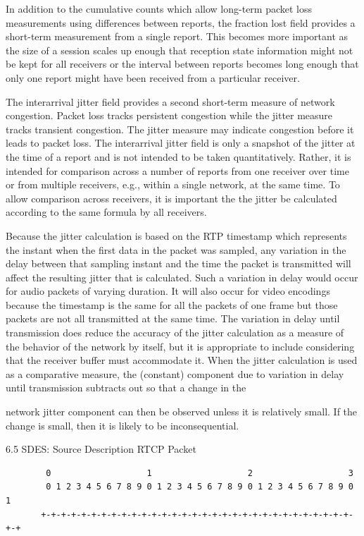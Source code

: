 \documentclass{article}
\begin{document}
In addition to the cumulative counts which allow long-term packet loss measurements using differences between reports, the fraction lost field provides a short-term measurement from a single report. This becomes more important as the size of a session scales up enough that reception state information might not be kept for all receivers or the interval between reports becomes long enough that only one report might have been received from a particular receiver.

The interarrival jitter field provides a second short-term measure of network congestion.  Packet loss tracks persistent congestion while the jitter measure tracks transient congestion.  The jitter measure may indicate congestion before it leads to packet loss.  The interarrival jitter field is only a snapshot of the jitter at the time of a report and is not intended to be taken quantitatively. Rather, it is intended for comparison across a number of reports from one receiver over time or from multiple receivers, e.g., within a single network, at the same time.  To allow comparison across receivers, it is important the the jitter be calculated according to the same formula by all receivers.

Because the jitter calculation is based on the RTP timestamp which represents the instant when the first data in the packet was sampled, any variation in the delay between that sampling instant and the time the packet is transmitted will affect the resulting jitter that is calculated.  Such a variation in delay would occur for audio packets of varying duration.  It will also occur for video encodings because the timestamp is the same for all the packets of one frame but those packets are not all transmitted at the same time.  The variation in delay until transmission does reduce the accuracy of the jitter calculation as a measure of the behavior of the network by itself, but it is appropriate to include considering that the receiver buffer must accommodate it.  When the jitter calculation is used as a comparative measure, the (constant) component due to variation in delay until transmission subtracts out so that a change in the

network jitter component can then be observed unless it is relatively small.  If the change is small, then it is likely to be inconsequential.

6.5 SDES: Source Description RTCP Packet

\begin{verbatim}
        0                   1                   2                   3
        0 1 2 3 4 5 6 7 8 9 0 1 2 3 4 5 6 7 8 9 0 1 2 3 4 5 6 7 8 9 0 1
       +-+-+-+-+-+-+-+-+-+-+-+-+-+-+-+-+-+-+-+-+-+-+-+-+-+-+-+-+-+-+-+-+
\end{verbatim}
\end{document}
